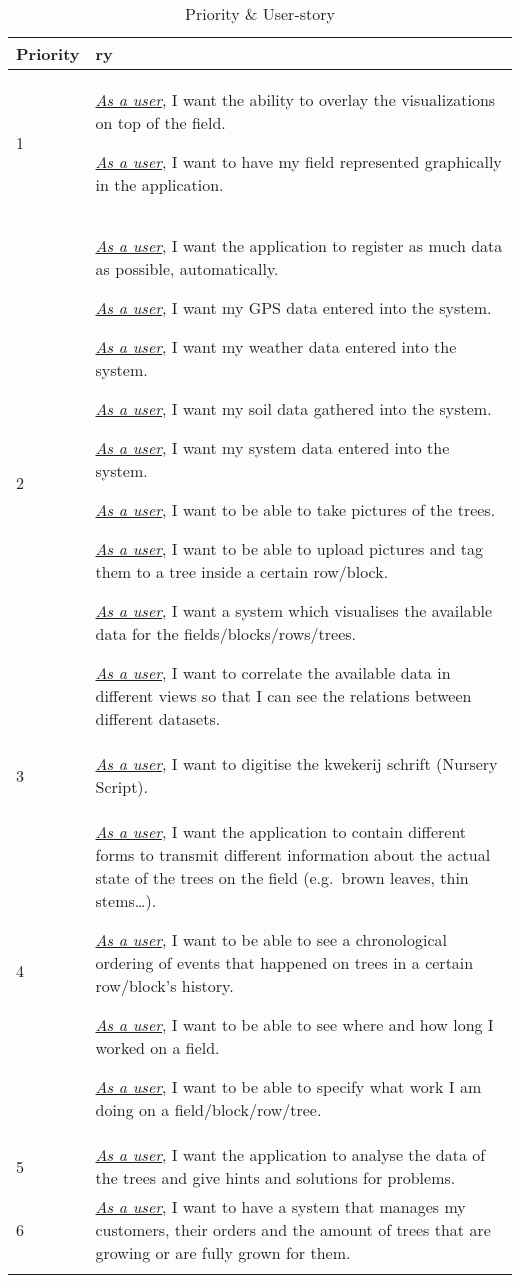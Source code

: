 	\begin{longtable}{ p{} p{} }
		Priority & \textbf{ry} \\     		\hline
		 1 & \underline{\textit{As a user}}, I want the ability to overlay the visualizations on top of the field. 
		
		\underline{\textit{As a user}}, I want to have my field represented graphically in the application. \\
		2 & \underline{\textit{As a user}}, I want the application to register as much data as possible, automatically.
		
		\underline{\textit{As a user}}, I want my GPS data entered into the system.
		
		\underline{\textit{As a user}}, I want my weather data entered into the system.
		
		\underline{\textit{As a user}}, I want my soil data gathered into the system.
		
		\underline{\textit{As a user}}, I want my system data entered into the system.
		
		\underline{\textit{As a user}}, I want to be able to take pictures of the trees.
		
		\underline{\textit{As a user}}, I want to be able to upload pictures and tag them to a tree inside a certain row/block.
		
		\underline{\textit{As a user}}, I want a system which visualises the available data for the fields/blocks/rows/trees.
		
		\underline{\textit{As a user}}, I want to correlate the available data in different views so that I can see the relations between different datasets. \\
		3 & \underline{\textit{As a user}}, I want to digitise the kwekerij schrift (Nursery Script). \\
		4 & \underline{\textit{As a user}}, I want the application to contain different forms to transmit different information about the actual state of the trees on the field (e.g.~brown leaves, thin stems\ldots{}).
		
		\underline{\textit{As a user}}, I want to be able to see a chronological ordering of events that happened on trees in a certain row/block's history.
		
		\underline{\textit{As a user}}, I want to be able to see where and how long I worked on a field.
		
		\underline{\textit{As a user}}, I want to be able to specify what work I am doing on a field/block/row/tree.\\
		5 & \underline{\textit{As a user}}, I want the application to analyse the data of the trees and give hints and solutions for problems.\\
		6 & \underline{\textit{As a user}}, I want to have a system that manages my customers, their orders and the amount of trees that are growing or are fully grown for them.\\
		\caption{Priority \& User-story\label{tab:RequirementsAndUserStories}}
	\end{longtable}
